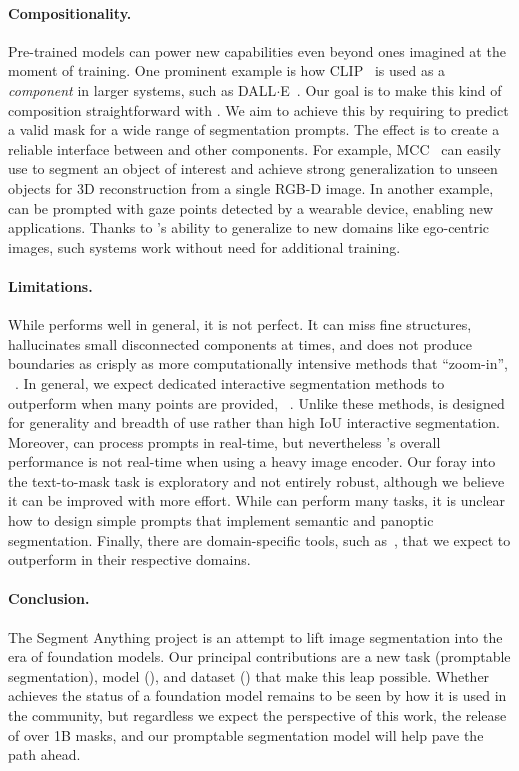 \paragraph{Compositionality.} Pre-trained models can power new capabilities even beyond ones imagined at the moment of training. One prominent example is how CLIP~\cite{Radford2021} is used as a \emph{component} in larger systems, such as DALL$\cdot$E~\cite{Ramesh2021}. Our goal is to make this kind of composition straightforward with \sam. We aim to achieve this by requiring \sam to predict a valid mask for a wide range of segmentation prompts. The effect is to create a reliable interface between \sam and other components. For example, MCC~\cite{wu2023multiview} can easily use \sam to segment an object of interest and achieve strong generalization to unseen objects for 3D reconstruction from a single RGB-D image. In another example, \sam can be prompted with gaze points detected by a wearable device, enabling new applications. Thanks to \sam's ability to generalize to new domains like ego-centric images, such systems work without need for additional training.

\paragraph{Limitations.} While \sam performs well in general, it is not perfect. It can miss fine structures, hallucinates small disconnected components at times, and does not produce boundaries as crisply as more computationally intensive methods that ``zoom-in'', \eg~\cite{chen2022focalclick}. In general, we expect dedicated interactive segmentation methods to outperform \sam when many points are provided, \eg~\cite{liu2022simpleclick}. Unlike these methods, \sam is designed for generality and breadth of use rather than high IoU interactive segmentation. Moreover, \sam can process prompts in real-time, but nevertheless \sam's overall performance is not real-time when using a heavy image encoder. Our foray into the text-to-mask task is exploratory and not entirely robust, although we believe it can be improved with more effort. While \sam can perform many tasks, it is unclear how to design simple prompts that implement semantic and panoptic segmentation. Finally, there are domain-specific tools, such as~\cite{berg2019}, that we expect to outperform \sam in their respective domains.

\paragraph{Conclusion.} The Segment Anything project is an attempt to lift image segmentation into the era of foundation models. Our principal contributions are a new task (promptable segmentation), model (\sam), and dataset (\sad) that make this leap possible. Whether \sam achieves the status of a foundation model remains to be seen by how it is used in the community, but regardless we expect the perspective of this work, the release of over 1B masks, and our promptable segmentation model will help pave the path ahead.

